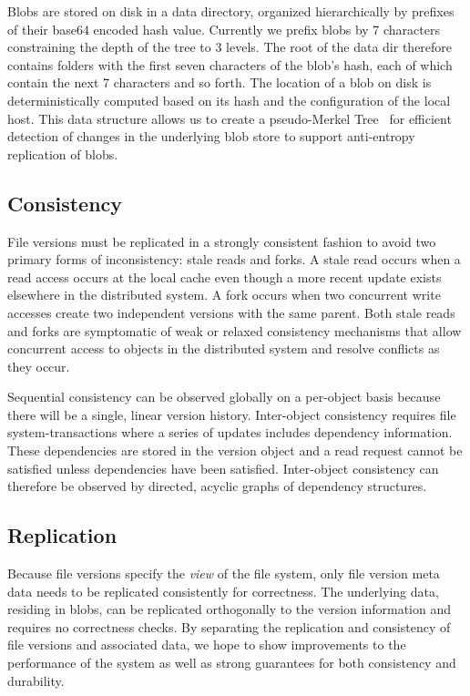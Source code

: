 \documentclass[letterpaper,twocolumn,10pt]{article}
\begin{document}
Blobs are stored on disk in a data directory, organized hierarchically by
prefixes of their base64 encoded hash value.
Currently we prefix blobs by 7 characters constraining the depth of the tree
to 3 levels.
The root of the data dir therefore contains folders with the first seven
characters of the blob's hash, each of which contain the next 7 characters
and so forth.
The location of a blob on disk is deterministically computed based on its
hash and the configuration of the local host.
This data structure allows us to create a pseudo-Merkel
Tree~\cite{merkle_digital_1987} for efficient detection of changes in the
underlying blob store to support anti-entropy replication of blobs.

\subsection*{Consistency}

File versions must be replicated in a strongly consistent fashion to avoid
two primary forms of inconsistency: stale reads and forks.
A stale read occurs when a read access occurs at the local cache even though
a more recent update exists elsewhere in the distributed system.
A fork occurs when two concurrent write accesses create two independent
versions with the same parent.
Both stale reads and forks are symptomatic of weak or relaxed consistency
mechanisms that allow concurrent access to objects in the distributed system
and resolve conflicts as they occur.

Sequential consistency can be observed globally on a per-object basis because
there will be a single, linear version history.
Inter-object consistency requires file system-transactions where a series of
updates includes dependency information.
These dependencies are stored in the version object and a read request cannot
be satisfied unless dependencies have been satisfied.
Inter-object consistency can therefore be observed by directed, acyclic
graphs of dependency structures.



\subsection*{Replication}

Because file versions specify the \textit{view} of the file system, only
file version meta data needs to be replicated consistently for correctness.
The underlying data, residing in blobs, can be replicated orthogonally to the
version information and requires no correctness checks.
By separating the replication and consistency of file versions and associated
data, we hope to show improvements to the performance of the system as well
as strong guarantees for both consistency and durability.
\end{document}
